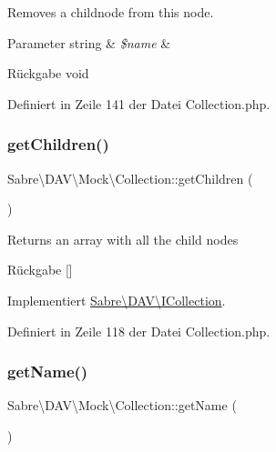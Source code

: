 Removes a childnode from this node.


\begin{DoxyParams}[1]{Parameter}
string & {\em \$name} & \\
\hline
\end{DoxyParams}
\begin{DoxyReturn}{Rückgabe}
void 
\end{DoxyReturn}


Definiert in Zeile 141 der Datei Collection.\+php.

\mbox{\label{class_sabre_1_1_d_a_v_1_1_mock_1_1_collection_a3814f1e53b147e13ebdddc6324639a80}} 
\subsubsection{\texorpdfstring{get\+Children()}{getChildren()}}
{\footnotesize\ttfamily Sabre\textbackslash{}\+D\+A\+V\textbackslash{}\+Mock\textbackslash{}\+Collection\+::get\+Children (\begin{DoxyParamCaption}{ }\end{DoxyParamCaption})}

Returns an array with all the child nodes

\begin{DoxyReturn}{Rückgabe}
\mbox{[}\mbox{]} 
\end{DoxyReturn}


Implementiert \mbox{\hyperlink{interface_sabre_1_1_d_a_v_1_1_i_collection_a5344a6890e49fd7a81bb0e38b4c6d0be}{Sabre\textbackslash{}\+D\+A\+V\textbackslash{}\+I\+Collection}}.



Definiert in Zeile 118 der Datei Collection.\+php.

\mbox{\label{class_sabre_1_1_d_a_v_1_1_mock_1_1_collection_ac7ad2f771a34a1099214f0e4e19897f9}} 
\subsubsection{\texorpdfstring{get\+Name()}{getName()}}
{\footnotesize\ttfamily Sabre\textbackslash{}\+D\+A\+V\textbackslash{}\+Mock\textbackslash{}\+Collection\+::get\+Name (\begin{DoxyParamCaption}{ }\end{DoxyParamCaption})}

